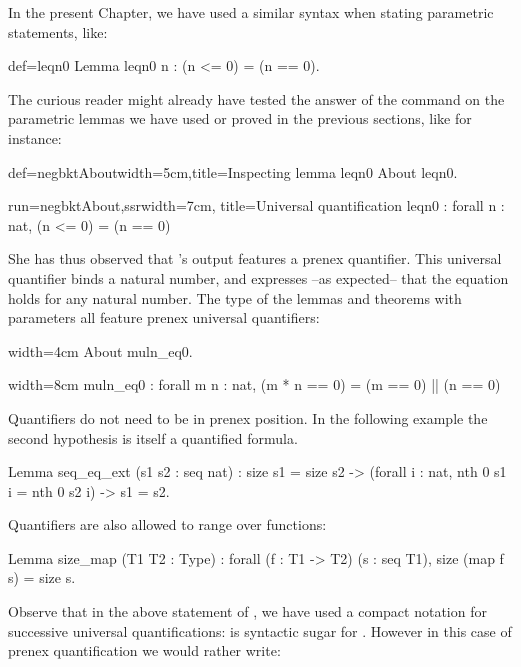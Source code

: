 In the present Chapter, we have used a similar syntax when stating
parametric statements, like:

\begin{coq}{def=leqn0}{}
Lemma leqn0 n : (n <= 0) = (n == 0).
\end{coq}

The curious reader might already have tested the answer of the
 command on the parametric lemmas we have used or proved in the
previous sections, like for instance:

\begin{coq}{def=negbktAbout}{width=5cm,title=Inspecting lemma leqn0}
About leqn0.
\end{coq}
\begin{coqout}{run=negbktAbout,ssr}{width=7cm, title=Universal quantification}
leqn0 : forall n : nat, (n <= 0) = (n == 0)
\end{coqout}

She has thus observed that \Coq{}'s output features a prenex
 quantifier. This universal quantifier binds a natural number, and
expresses --as expected-- that the equation holds for any
natural number. The type of the lemmas and theorems with parameters all feature
prenex universal quantifiers:

\begin{coq}{}{width=4cm}
About muln_eq0.
$~$
\end{coq}
\begin{coqout}{}{width=8cm}
muln_eq0 : forall m n : nat,
  (m * n == 0) = (m == 0) || (n == 0)
\end{coqout}
Quantifiers do not need to be in prenex position.  In the following
example the second hypothesis is itself a quantified formula.

\begin{coq}{}{}
Lemma seq_eq_ext (s1 s2 : seq nat) :
  size s1 = size s2 ->
  (forall i : nat, nth 0 s1 i = nth 0 s2 i) ->
  s1 = s2.
\end{coq}
Quantifiers are also allowed to range over functions:

\begin{coq}{}{}
Lemma size_map (T1 T2 : Type) :
forall (f : T1 -> T2) (s : seq T1), size (map f s) = size s.
\end{coq}
Observe that in the above statement of , we have used a
compact notation for successive universal quantifications:
 is syntactic sugar for
. However in this case
of prenex quantification we would rather write:

